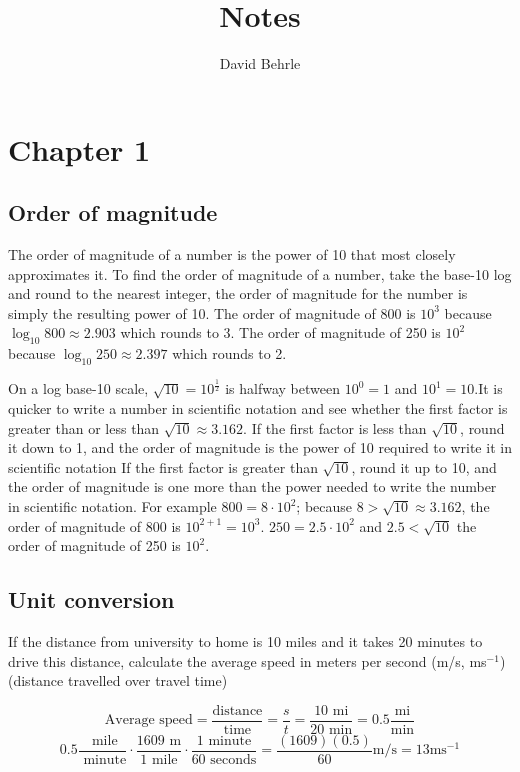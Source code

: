 \documentclass[a4paper]{article}
\title{Notes}
\author{David Behrle}
\begin{document}
\maketitle
\section{Chapter 1}
    \subsection{Order of magnitude}

    The order of magnitude of a number is the power of 10 that most closely approximates it. To find the order of magnitude of a number, take the base-10 log and round to the nearest integer, the order of magnitude for the number is simply the resulting power of 10. The order of magnitude of 800 is $10^3$ because $\log_{10}800 \approx 2.903$ which rounds to 3. The order of magnitude of 250 is $10^2$ because $\log_{10}250 \approx 2.397$ which rounds to 2.
    
    On a log base-10 scale, $\sqrt{10} = 10^{\frac{1}{2}}$ is halfway between $10^0 = 1$ and $10^1 = 10$.It is quicker to write a number in scientific notation and see whether the first factor is greater than or less than $\sqrt{10} \approx 3.162$. If the first factor is less than $\sqrt{10}$, round it down to 1, and the order of magnitude is the power of 10 required to write it in scientific notation If the first factor is greater than $\sqrt{10}$, round it up to 10, and the order of magnitude is one more than the power needed to write the number in scientific notation. For example $800 = 8 \cdot 10^2$; because $8 > \sqrt{10} \approx 3.162$, the order of magnitude of 800 is $10^{2+1} = 10^3$. $250 = 2.5 \cdot 10^2$ and $2.5 < \sqrt{10}$ the order of magnitude of 250 is $10^2$.

    \subsection{Unit conversion}

    If the distance from university to home is 10 miles and it takes 20 minutes to drive this distance, calculate the average speed in meters per second (m/s, ms$^{-1}$) (distance travelled over travel time)

    \begin{equation}
        \text{Average speed} = \frac{\text{distance}}{\text{time}} = \frac{s}{t} = \frac{10 \text{ mi}}{20 \text{ min}} = 0.5 \frac{\text{mi}}{\text{min}}
    \end{equation}
    \begin{equation}
        0.5 \frac{\text{ mile}}{\text{ minute}} \cdot \frac{1609 \text{ m}}{1 \text{ mile}} \cdot \frac{1 \text{ minute}}{60 \text{ seconds}} = \frac{(1609)(0.5)}{60} \text{m/s} = 13 \text{ms$^{-1}$}
    \end{equation}
\end{document}
